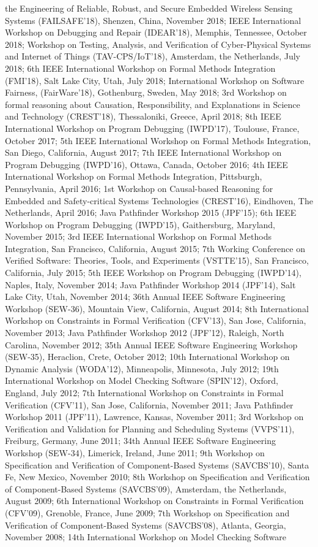 \documentclass[ComputerScience]{vita}
\begin{document}
\begin{vita}
\begin{Panel and Committee Service}
  the Engineering of Reliable, Robust, and Secure Embedded Wireless
  Sensing Systems (FAILSAFE'18), Shenzen, China, November 2018; IEEE
  International Workshop on Debugging and Repair (IDEAR'18), Memphis,
  Tennessee, October 2018; Workshop on Testing, Analysis, and Verification of Cyber-Physical Systems and Internet of Things (TAV-CPS/IoT'18), Amsterdam, the Netherlands, July 2018; 6th IEEE International Workshop on Formal Methods Integration (FMI'18), Salt Lake City, Utah, July 2018;  International Workshop on Software Fairness, (FairWare'18), Gothenburg, Sweden, May 2018; 3rd Workshop on formal reasoning about Causation, Responsibility, and Explanations in Science and Technology (CREST'18), Thessaloniki, Greece, April 2018; 8th IEEE International Workshop on Program Debugging (IWPD'17), Toulouse, France, October 2017; 5th IEEE International Workshop on Formal Methods Integration, San Diego, California, August 2017; 7th IEEE International Workshop on Program Debugging (IWPD'16), Ottawa, Canada, October 2016; 4th IEEE International Workshop on Formal Methods Integration, Pittsburgh, Pennsylvania, April 2016; 1st Workshop on Causal-based Reasoning for Embedded and Safety-critical Systems Technologies (CREST'16), Eindhoven, The Netherlands, April 2016; Java Pathfinder Workshop 2015 (JPF'15); 6th IEEE Workshop on Program Debugging (IWPD'15), Gaithersburg, Maryland, November 2015; 3rd IEEE International Workshop on Formal Methods Integration, San Francisco, California, August 2015; 7th Working Conference on Verified Software:  Theories, Tools, and Experiments (VSTTE'15), San Francisco, California, July 2015; 5th IEEE Workshop on Program Debugging (IWPD'14), Naples, Italy, November 2014; Java Pathfinder Workshop 2014 (JPF'14), Salt Lake City, Utah, November 2014; 36th Annual IEEE Software Engineering Workshop (SEW-36), Mountain View, California, August 2014; 8th International Workshop on Constraints in Formal Verification (CFV'13), San Jose, California, November 2013; Java Pathfinder Workshop 2012 (JPF'12), Raleigh, North Carolina, November 2012; 35th Annual IEEE Software Engineering Workshop (SEW-35), Heraclion, Crete, October 2012; 10th International Workshop on Dynamic Analysis (WODA'12), Minneapolis, Minnesota, July 2012; 19th International Workshop on Model Checking Software (SPIN'12), Oxford, England, July 2012; 7th International Workshop on Constraints in Formal Verification (CFV'11), San Jose, California, November 2011; Java Pathfinder Workshop 2011 (JPF'11), Lawrence, Kansas, November 2011; 3rd Workshop on Verification and Validation for Planning and Scheduling Systems (VVPS'11), Freiburg, Germany, June 2011; 34th Annual IEEE Software Engineering Workshop (SEW-34), Limerick, Ireland, June 2011; 9th Workshop on Specification and Verification of Component-Based Systems (SAVCBS'10), Santa Fe, New Mexico, November 2010; 8th Workshop on Specification and Verification of Component-Based Systems (SAVCBS'09), Amsterdam, the Netherlands, August 2009; 6th International Workshop on Constraints in Formal Verification (CFV'09), Grenoble, France, June 2009; 7th Workshop on Specification and Verification of Component-Based Systems (SAVCBS'08), Atlanta, Georgia, November 2008; 14th International Workshop on Model Checking Software 
\end{Panel and Committee Service}
\end{vita}
\end{document}
